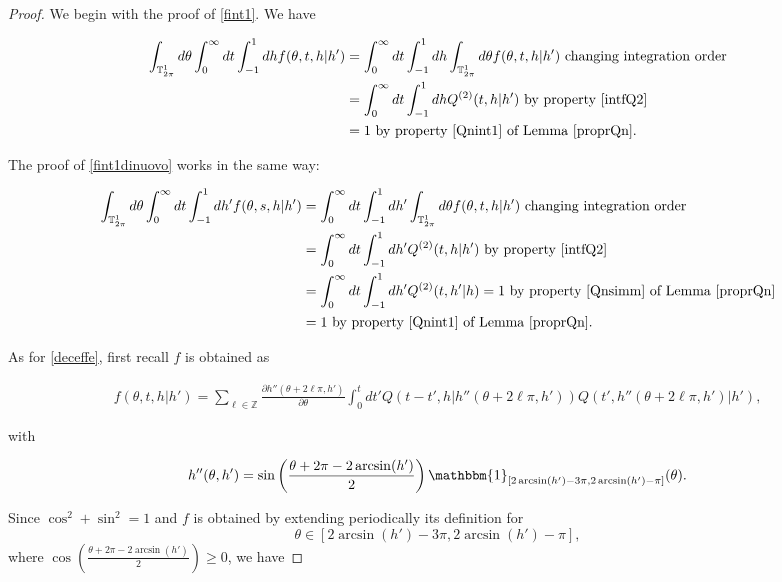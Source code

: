 \documentclass[a4paper,10pt,reqno]{amsart}
\numberwithin{equation}{subsection}
\numberwithin{figure}{subsection}
\begin{document}
\begin{proof} We begin with the proof of \eqref{fint1}. We have

{\footnotesize\begin{align*}
\int_{\mathbb{T}^1_{2\pi}}d\theta\int_0^{\infty}dt\int_{-1}^1dhf(\theta,t,h|h')&=\int_0^{\infty}dt\int_{-1}^1dh\int_{\mathbb{T}^1_{2\pi}}d\theta f(\theta,t,h|h')\textrm{ changing integration order}
\\
&=\int_0^{\infty}dt\int_{-1}^1dhQ^{(2)}(t,h|h')\textrm{ by property \eqref{intfQ2}}
\\
&=1\textrm{ by property \eqref{Qnint1} of Lemma \ref{proprQn}.}
\end{align*}}

The proof of \eqref{fint1dinuovo} works in the same way:

{\footnotesize\begin{align*}
\int_{\mathbb{T}^1_{2\pi}}d\theta\int_0^{\infty}dt\int_{-1}^1dh'f(\theta,s,h|h')&=\int_0^{\infty}dt\int_{-1}^1dh'\int_{\mathbb{T}^1_{2\pi}}d\theta f(\theta,t,h|h')\textrm{ changing integration order}
\\
&=\int_0^{\infty}dt\int_{-1}^1dh'Q^{(2)}(t,h|h')\textrm{ by property \eqref{intfQ2}}
\\
&=\int_0^{\infty}dt\int_{-1}^1dh'Q^{(2)}(t,h'|h)=1\textrm{ by property \eqref{Qnsimm} of Lemma \ref{proprQn}}
\\
&=1\textrm{ by property \eqref{Qnint1} of Lemma \ref{proprQn}.}
\end{align*}}

As for \eqref{deceffe}, first recall $f$ is obtained as

{\footnotesize\begin{align*}
f(\theta,t,h|h')=\sum_{\ell\in\mathbb{Z}}\frac{\partial h''(\theta+2\ell\pi,h')}{\partial\theta}\int_0^tdt' Q(t-t',h|h''(\theta+2\ell\pi,h'))Q(t',h''(\theta+2\ell\pi,h')|h'),
\end{align*}}

with

\begin{align*}
h''(\theta,h')=\sin\left(\frac{\theta+2\pi-2\arcsin(h')}{2}\right)\mathbbm{1}_{[2\arcsin(h')-3\pi,2\arcsin(h')-\pi]}(\theta).
\end{align*}

Since $\cos^2+\sin^2=1$ and $f$ is obtained by extending periodically its definition for
\[
\theta\in[2\arcsin(h')-3\pi,2\arcsin(h')-\pi],
\]
where $\cos\left(\frac{\theta+2\pi-2\arcsin(h')}{2}\right)\geq0$, we have


\end{proof}
\end{document}
